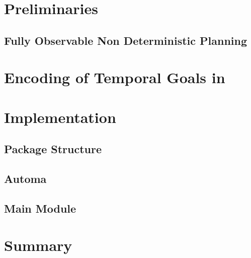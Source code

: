 \section{Preliminaries}
\subsection{\PDDL}
\subsection{Fully Observable Non Deterministic Planning}
\section{Encoding of Temporal Goals in \PDDL}
\section{Implementation}
\subsection{Package Structure}
\subsection{\PDDL}
\subsection{Automa}
\subsection{Main Module}
\section{Summary}
